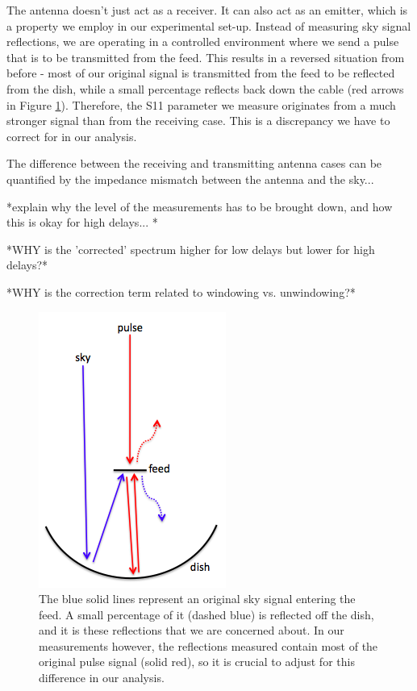 \documentclass[12pt,preprint]{aastex}
\begin{document}
The antenna doesn't just act as a receiver. It can also act as an emitter, which is a property we employ in our experimental set-up. Instead of measuring sky signal reflections, we are operating in a controlled environment where we send a pulse that is to be transmitted from the feed. This results in a reversed situation from before - most of our original signal is transmitted from the feed to be reflected from the dish, while a small percentage reflects back down the cable (red arrows in Figure \ref{fig:cartoon}). Therefore, the S11 parameter we measure originates from a much stronger signal than from the receiving case. This is a discrepancy we have to correct for in our analysis.

The difference between the receiving and transmitting antenna cases can be quantified by the impedance mismatch between the antenna and the sky...

*explain why the level of the measurements has to be brought down, and how this is okay for high delays... *

*WHY is the 'corrected' spectrum higher for low delays but lower for high delays?*

*WHY is the correction term related to windowing vs. unwindowing?*

\begin{figure}
\centering
\includegraphics[totalheight=0.5\textheight]{plots/reflection_cartoon.png}
\caption{The blue solid lines represent an original sky signal entering the feed. A small percentage of it (dashed blue) is reflected off the dish, and it is these reflections that we are concerned about. In our measurements however, the reflections measured contain most of the original pulse signal (solid red), so it is crucial to adjust for this difference in our analysis.}
\label{fig:cartoon}
\end{figure}
\end{document}
